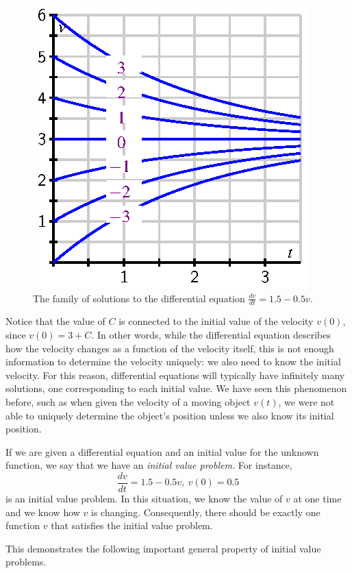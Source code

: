 \begin{figure}[h]
\begin{center}
\includegraphics{figures/7_1_family.eps}
\caption{The family of solutions to the differential equation $\frac{dv}{dt} = 1.5 - 0.5v$.} \label{F:7.1.family} 
\end{center}
\end{figure}

Notice that the value of $C$ is connected to the initial value of the
velocity $v(0)$, since $v(0) = 3+C$.  In other words, while the
differential equation describes how the velocity changes as a function of the velocity itself, this is not enough information to determine the velocity
uniquely:  we also need to know the initial velocity.  For this
reason, differential equations will typically have infinitely many
solutions, one corresponding to each initial value.  We have seen this phenomenon before, such as when given the velocity of a moving object
$v(t)$, we were not able to uniquely determine the object's position
unless we also know its initial position.

If we are given a differential equation and an initial value for the
unknown function, we say that we have an {\em initial value problem.}
For instance,
$$
  \frac{dv}{dt} = 1.5-0.5v, \ v(0) = 0.5
$$
is an initial value problem.  In this situation, we know the value of
$v$ at one time and we know how $v$ is changing.  Consequently, there should
be exactly one function $v$ that satisfies the initial value problem.

This demonstrates the following important general property of initial value problems.

